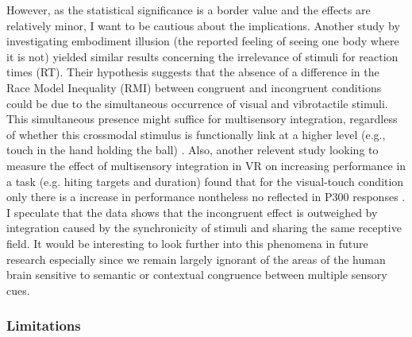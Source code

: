 \documentclass[12pt,oneside,openright]{report}
\begin{document}
However, as the statistical significance is a border value and the effects are relatively minor, I want to be cautious about the implications. Another study by \cite{RSE_FBI} investigating embodiment illusion (the reported feeling of seeing one body where it is not) yielded similar results concerning the irrelevance of stimuli for reaction times (RT). Their hypothesis suggests that the absence of a difference in the Race Model Inequality (RMI) between congruent and incongruent conditions could be due to the simultaneous occurrence of visual and vibrotactile stimuli. This simultaneous presence might suffice for multisensory integration, regardless of whether this crossmodal stimulus is functionally link at a higher level (e.g., touch in the hand holding the ball) \parencite{RSE_FBI}. Also, another relevent study looking to measure the effect of multisensory integration in VR on increasing performance in a task (e.g. hiting targets and duration) found that for the visual-touch condition only there is a increase in performance nontheless no reflected in P300 responses \parencite{Marucci2021TheIO}.  
I speculate that the data shows that the incongruent effect is outweighed by integration caused by the synchronicity of stimuli and sharing the same receptive field. It would be interesting to look further into this phenomena in future research especially since we remain largely ignorant of the areas of the human brain sensitive to semantic or contextual congruence between multiple sensory cues. 

\subsubsection*{Limitations}
\end{document}
